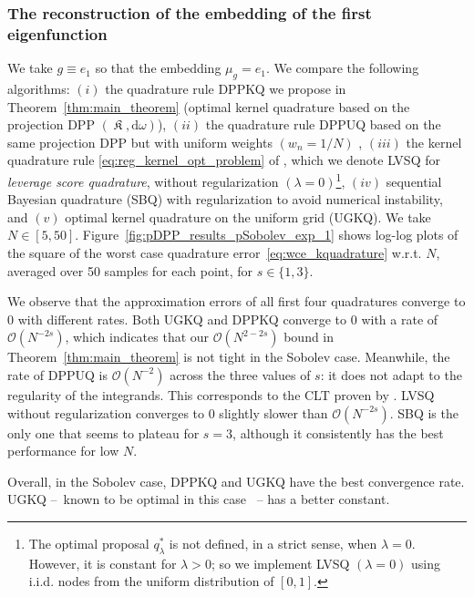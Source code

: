 \documentclass[twoside,11pt]{book}
\numberwithin{theorem}{chapter}
\numberwithin{definition}{chapter}
\numberwithin{proposition}{chapter}
\numberwithin{corollary}{chapter}
\numberwithin{example}{chapter}
\numberwithin{lemma}{chapter}
\numberwithin{assumption}{chapter}
\numberwithin{equation}{chapter}
\numberwithin{figure}{chapter}
\DeclareMathOperator*{\KDPP}{\mathfrak{K}}
\begin{document}
\subsubsection{The reconstruction of the embedding of the first eigenfunction}
 We take $g\equiv e_{1}$ so that the embedding $\mu_{g} = e_{1}$. We compare the following algorithms: $(i)$ the quadrature rule DPPKQ we propose in Theorem~\ref{thm:main_theorem} (optimal kernel quadrature based on the projection DPP $(\KDPP, \mathrm{d}\omega)$), $(ii)$ the quadrature rule DPPUQ based on the same projection DPP but with uniform weights $(w_{n} = 1/N)$ \parencite{Joh97}, $(iii)$ the kernel quadrature rule \eqref{eq:reg_kernel_opt_problem} of \cite{Bac17}, which we denote LVSQ for \emph{leverage score quadrature}, without regularization $(\lambda =0)$\footnote{The optimal proposal $q_{\lambda}^*$ is not defined, in a strict sense, when $\lambda = 0$. However, it is constant for $\lambda>0$; so we implement LVSQ $(\lambda = 0)$ using i.i.d. nodes from the uniform distribution of $[0,1]$.}, $(iv)$ sequential Bayesian quadrature (SBQ) \parencite{HuDu12} with regularization to avoid numerical instability, and $(v)$ optimal kernel quadrature on the uniform grid (UGKQ). We take $N \in [5,50]$. Figure~\ref{fig:pDPP_results_pSobolev_exp_1} shows log-log plots of the square of the worst case quadrature error~\eqref{eq:wce_kquadrature} w.r.t. $N$, averaged over 50 samples for each point, for $s \in \{1,3\}$.


 We observe that the approximation errors of all first four quadratures converge to $0$ with different rates. Both UGKQ and DPPKQ converge to $0$ with a rate of $\mathcal{O}(N^{-2s})$, which indicates that our $\mathcal{O}(N^{2-2s})$ bound in Theorem~\ref{thm:main_theorem} is not tight in the Sobolev case. Meanwhile, the rate of DPPUQ is $\mathcal{O}(N^{-2})$ across the three values of $s$: it does not adapt to the regularity of the integrands. This corresponds to the CLT proven by \cite{Joh97}.
  LVSQ without regularization converges to $0$ slightly slower than $\mathcal{O}(N^{-2s})$. SBQ is the only one that seems to plateau for $s = 3$, although it consistently has the best performance for low $N$.


Overall, in the Sobolev case, DPPKQ and UGKQ have the best convergence rate. UGKQ --~known to be optimal in this case \parencite{Boj81}~-- has a better constant.
\end{document}

